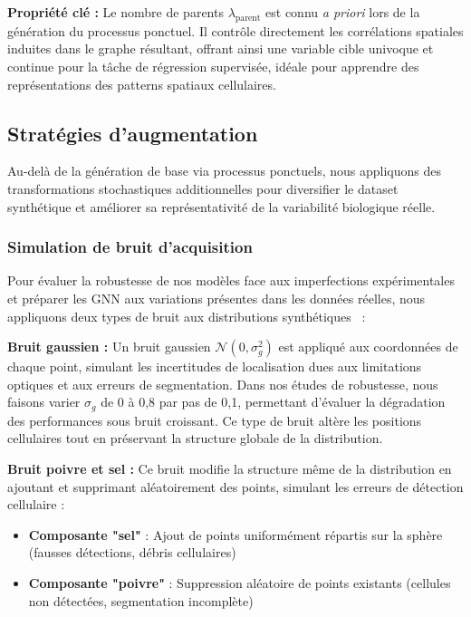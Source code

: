 \textbf{Propriété clé :} Le nombre de parents $\lambda_{\text{parent}}$ est connu \textit{a priori} lors de la génération du processus ponctuel. Il contrôle directement les corrélations spatiales induites dans le graphe résultant, offrant ainsi une variable cible univoque et continue pour la tâche de régression supervisée, idéale pour apprendre des représentations des patterns spatiaux cellulaires.

\subsection{Stratégies d'augmentation}

Au-delà de la génération de base via processus ponctuels, nous appliquons des transformations stochastiques additionnelles pour diversifier le dataset synthétique et améliorer sa représentativité de la variabilité biologique réelle.

\subsubsection{Simulation de bruit d'acquisition}

Pour évaluer la robustesse de nos modèles face aux imperfections expérimentales et préparer les GNN aux variations présentes dans les données réelles, nous appliquons deux types de bruit aux distributions synthétiques~\cite{Martin2025GRETSI2} :

\textbf{Bruit gaussien :}
Un bruit gaussien $\mathcal{N}(0, \sigma_g^2)$ est appliqué aux coordonnées de chaque point, simulant les incertitudes de localisation dues aux limitations optiques et aux erreurs de segmentation. Dans nos études de robustesse, nous faisons varier $\sigma_g$ de 0 à 0,8 par pas de 0,1, permettant d'évaluer la dégradation des performances sous bruit croissant. Ce type de bruit altère les positions cellulaires tout en préservant la structure globale de la distribution.

\textbf{Bruit poivre et sel :}
Ce bruit modifie la structure même de la distribution en ajoutant et supprimant aléatoirement des points, simulant les erreurs de détection cellulaire :
\begin{itemize}
    \item \textbf{Composante "sel"} : Ajout de points uniformément répartis sur la sphère (fausses détections, débris cellulaires)
    \item \textbf{Composante "poivre"} : Suppression aléatoire de points existants (cellules non détectées, segmentation incomplète)
\end{itemize}

